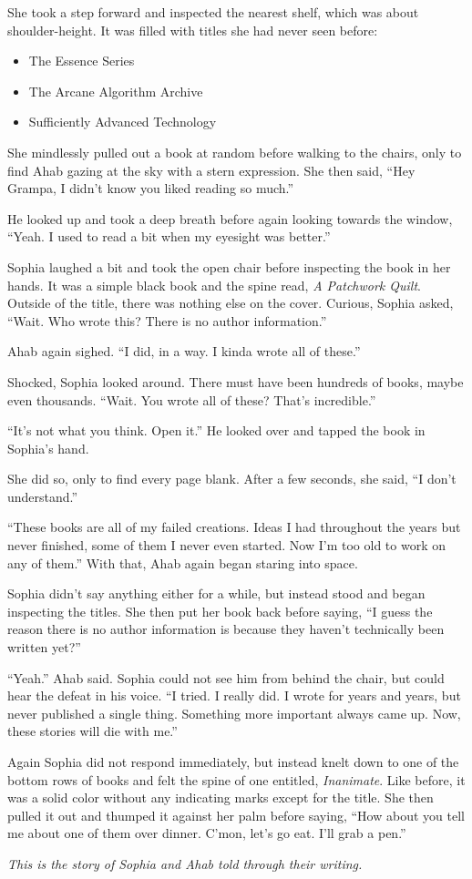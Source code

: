 She took a step forward and inspected the nearest shelf, which was about shoulder-height. It was filled with titles she had never seen before:

\begin{itemize}
\item The Essence Series
\item The Arcane Algorithm Archive
\item Sufficiently Advanced Technology
\end{itemize}

She mindlessly pulled out a book at random before walking to the chairs, only to find Ahab gazing at the sky with a stern expression.
She then said, ``Hey Grampa, I didn't know you liked reading so much.''

He looked up and took a deep breath before again looking towards the window, ``Yeah. I used to read a bit when my eyesight was better.''

Sophia laughed a bit and took the open chair before inspecting the book in her hands.
It was a simple black book and the spine read, \emph{A Patchwork Quilt}.
Outside of the title, there was nothing else on the cover.
Curious, Sophia asked, ``Wait. Who wrote this? There is no author information.''

Ahab again sighed. ``I did, in a way. I kinda wrote all of these.''

Shocked, Sophia looked around.
There must have been hundreds of books, maybe even thousands. ``Wait. You wrote all of these? That's incredible.''

``It's not what you think. Open it.'' He looked over and tapped the book in Sophia's hand.

She did so, only to find every page blank.
After a few seconds, she said, ``I don't understand.''

``These books are all of my failed creations. Ideas I had throughout the years but never finished, some of them I never even started. Now I'm too old to work on any of them.'' With that, Ahab again began staring into space.

Sophia didn't say anything either for a while, but instead stood and began inspecting the titles.
She then put her book back before saying, ``I guess the reason there is no author information is because they haven't technically been written yet?''

``Yeah.'' Ahab said. Sophia could not see him from behind the chair, but could hear the defeat in his voice.
``I tried. I really did. I wrote for years and years, but never published a single thing. Something more important always came up. Now, these stories will die with me.''

Again Sophia did not respond immediately, but instead knelt down to one of the bottom rows of books and felt the spine of one entitled, \emph{Inanimate}.
Like before, it was a solid color without any indicating marks except for the title.
She then pulled it out and thumped it against her palm before saying, ``How about you tell me about one of them over dinner. C'mon, let's go eat. I'll grab a pen.''

\emph{This is the story of Sophia and Ahab told through their writing.}